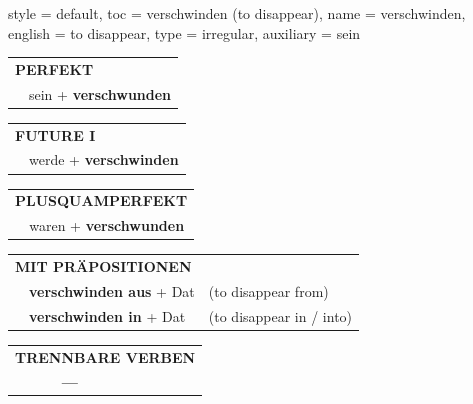 \begin{verbentry}{
  style = {default},
  toc = {verschwinden (to disappear)},
  name = {verschwinden},
  english = {to disappear},
  type = {irregular},
  auxiliary = {sein}
}
 \begin{tabular}{rl}
     \multicolumn{2}{l}{\textbf{PERFEKT}}\\
   & sein + \textbf{verschwunden}\\
  \end{tabular}
\hfill
   \begin{tabular}{rl}
    \multicolumn{2}{l}{\textbf{FUTURE I} }\\
   & werde + \textbf{verschwinden}\\
  \end{tabular}
\hfill
   \begin{tabular}{rl}
      \multicolumn{2}{l}{\textbf{PLUSQUAMPERFEKT}}\\
   & waren + \textbf{verschwunden}\\
  \end{tabular}

   \vspace{10pt}

   \begin{tabular}{lll}
      \multicolumn{3}{l}{\textbf{MIT PRÄPOSITIONEN}}\\
& \textbf{verschwinden aus} + Dat & (to disappear from)\\
& \textbf{verschwinden in} + Dat & (to disappear in / into)\\
\end{tabular}
  \hfill
   \begin{tabular}{lll}
\multicolumn{3}{l}{\textbf{TRENNBARE VERBEN}}\\
& \textbf{---} & \\
\end{tabular}

  \vspace{-5pt}
\end{verbentry}

